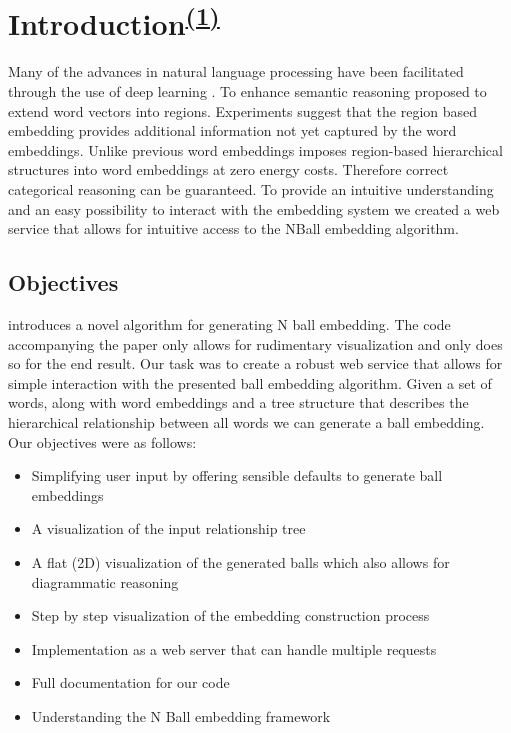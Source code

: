 \chapter[Introduction]{Introduction\textsuperscript{\hyperref[Jan]{(1)}}}

Many of the advances in natural language processing have been facilitated through the use of deep learning \cite{mikolov2013efficient,devlin2019bert,raffel2020exploring}. To enhance semantic reasoning \cite{Erk} proposed to extend word vectors into regions. Experiments suggest that the region based embedding provides additional information not yet captured by the word embeddings. Unlike previous word embeddings \cite{dong2018encoding} imposes region-based hierarchical structures into word embeddings at zero energy costs. Therefore correct categorical reasoning can be guaranteed. To provide an intuitive understanding and an easy possibility to interact with the embedding system we created a web service that allows for intuitive access to the NBall embedding algorithm. 

\section{Objectives}
\label{objectives}
\cite{dong2018encoding} introduces a novel algorithm for generating N ball embedding. The code accompanying the paper only allows for rudimentary visualization and only does so for the end result. Our task was to create a robust web service that allows for simple interaction with the presented ball embedding algorithm. 
Given a set of words, along with word embeddings and a tree structure that describes the hierarchical relationship between all words we can generate a ball embedding. \\

Our objectives were as follows:
\begin{itemize}
	\item Simplifying user input by offering sensible defaults to generate ball embeddings
	\item A visualization of the input relationship tree
	\item A flat (2D) visualization of the generated balls which also allows for diagrammatic reasoning
	\item Step by step visualization of the embedding construction process
	\item Implementation as a web server that can handle multiple requests
	\item Full documentation for our code
	\item Understanding the N Ball embedding framework
\end{itemize}


